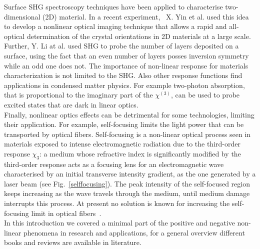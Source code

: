 Surface SHG spectroscopy techniques have been applied to characterise two-dimensional (2D) material. In a recent experiment,~\cite{yin2014edge}  X. Yin et al. used this idea to develop a nonlinear optical imaging technique that allows a rapid and all-optical determination of the crystal orientations in 2D materials at a large scale. %
Further, Y. Li at al. used SHG to probe the number of layers deposited on a surface, using the fact that an even number of layers posses inversion symmetry while an odd one does not.\cite{doi:10.1021/nl401561r} The importance of non-linear response for materials characterization is not limited to the SHG. Also other response functions find applications in condensed matter physics. For example two-photon absorption, that is proportional to the imaginary part of the $\chi^{(3)}$, can be used to probe excited states that are dark in linear optics.\cite{wang2005optical,cassabois2015hexagonal}\\

Finally, nonlinear optics effects can be detrimental for some technologies, limiting their application. For example, self-focusing limits the light power that can be transported by optical fibers. Self-focusing is a non-linear optical process seen in materials exposed to intense electromagnetic radiation due to the third-order response $\chi_3$:  a medium whose refractive index is significantly modified by the third-order response acts as a focusing lens for an electromagnetic wave characterised by an initial transverse intensity gradient, as the one generated by a laser beam (see Fig.~\ref{selffocusing}). The peak intensity of the self-focused region keeps increasing as the wave travels through the medium, until medium damage interrupts this process. At present no solution is known for increasing the self-focusing limit in optical fibers~\cite{encylaser}.\\
In this introduction we covered a minimal part of the positive and negative non-linear phenomena in research and applications, for a general overview different books and reviews are available in literature.\cite{boyd,bloembergen1982nonlinear}

